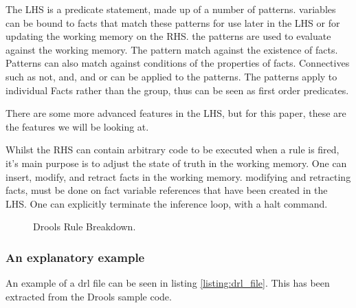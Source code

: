The LHS is a predicate statement, made up of a number of patterns.
variables can be bound to facts that match these patterns for use later in the LHS or for updating the working memory on the RHS.
the patterns are used to evaluate against the working memory.
The pattern match against the existence of facts.
Patterns can also match against conditions of the properties of facts.
Connectives such as not, and, and or can be applied to the patterns.
The patterns apply to individual Facts rather than the group, thus can be seen as first order predicates.

There are some more advanced features in the LHS, but for this paper, these are the features we will be looking at.

Whilst the RHS can contain arbitrary code to be executed when a rule is fired, it's main purpose is to adjust the state of truth in the working memory.
One can insert, modify, and retract facts in the working memory.
modifying and retracting facts, must be done on fact variable references that have been created in the LHS.
One can explicitly terminate the inference loop, with a halt command.

\begin{figure}[h]
    \centering
    \caption{Drools Rule Breakdown.}
    \label{fig:Drools_Rule_Breakdown}
\end{figure}


\subsubsection{An explanatory example}
An example of a drl file can be seen in listing \ref{listing:drl_file}.
This has been extracted from the Drools sample code.

